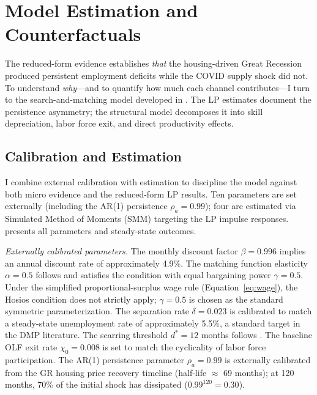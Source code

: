 \documentclass[12pt]{article}
\begin{document}
\section{Model Estimation and Counterfactuals}
\label{sec:model_estimation}

The reduced-form evidence establishes \textit{that} the housing-driven Great Recession produced persistent employment deficits while the COVID supply shock did not. To understand \textit{why}---and to quantify how much each channel contributes---I turn to the search-and-matching model developed in . The LP estimates document the persistence asymmetry; the structural model decomposes it into skill depreciation, labor force exit, and direct productivity effects.

\subsection{Calibration and Estimation}

I combine external calibration with estimation to discipline the model against both micro evidence and the reduced-form LP results. Ten parameters are set externally (including the AR(1) persistence $\rho_a = 0.99$); four are estimated via Simulated Method of Moments (SMM) targeting the LP impulse responses.  presents all parameters and steady-state outcomes.



\textit{Externally calibrated parameters.} The monthly discount factor $\beta = 0.996$ implies an annual discount rate of approximately 4.9\%. The matching function elasticity $\alpha = 0.5$ follows \citet{petrongolo2001looking} and satisfies the \citet{hosios1990welfare} condition with equal bargaining power $\gamma = 0.5$. Under the simplified proportional-surplus wage rule (Equation~\ref{eq:wage}), the Hosios condition does not strictly apply; $\gamma = 0.5$ is chosen as the standard symmetric parameterization. The separation rate $\delta = 0.023$ is calibrated to match a steady-state unemployment rate of approximately 5.5\%, a standard target in the DMP literature. The scarring threshold $d^* = 12$ months follows \citet{kroft2016long}. The baseline OLF exit rate $\chi_0 = 0.008$ is set to match the cyclicality of labor force participation. The AR(1) persistence parameter $\rho_a = 0.99$ is externally calibrated from the GR housing price recovery timeline (half-life $\approx$ 69 months); at 120 months, 70\% of the initial shock has dissipated ($0.99^{120} = 0.30$).
\end{document}
